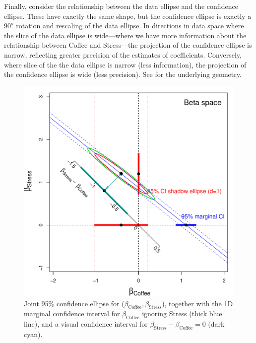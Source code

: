 Finally, consider the relationship between the data ellipse and the
confidence ellipse.  These have exactly the same shape, but
the confidence ellipse
is exactly a $90^o$ rotation and rescaling of the data ellipse.  In directions in
data space where the slice of the data ellipse is wide---where we have more information
about the relationship between Coffee and Stress---the projection of the confidence ellipse is
narrow, reflecting greater precision of the estimates of coefficients.
Conversely, where slice of the the data ellipse is narrow (less information), the projection of the
confidence ellipse is wide (less precision). See 
for the underlying geometry.

\begin{figure}[htb]
  \centering
  \includegraphics[width=.6\textwidth,clip]{fig/vis-reg-coffee13}
  \caption{Joint 95\% confidence ellipse for ($\beta_{\mathrm{Coffee}}, \beta_{\mathrm{Stress}}$),
  together with the 1D marginal confidence interval for $\beta_{\mathrm{Coffee}}$
  ignoring Stress (thick blue line), and a visual confidence interval for $\beta_{\mathrm{Stress}} - \beta_{\mathrm{Coffee}}=0$
  (dark cyan).
  }%
  \label{fig:vis-reg-coffee13}
\end{figure}

